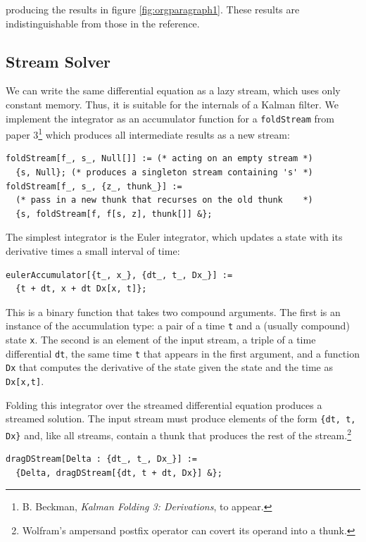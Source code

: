 \documentclass[10pt,oneside,x11names]{article}
\begin{document}
\noindent producing the results in figure \ref{fig:orgparagraph1}.
These results are indistinguishable from those in the reference.

\subsection{Stream Solver}
\label{sec:orgheadline6}

We can write the same differential equation as a lazy stream, which uses only
constant memory. Thus, it is suitable for the internals of a Kalman filter. We
implement the integrator as an accumulator function for a \texttt{foldStream} from
paper 3\footnote{B. Beckman, \emph{Kalman Folding 3: Derivations}, to appear.} which produces all intermediate results as a new stream:

\begin{verbatim}
foldStream[f_, s_, Null[]] := (* acting on an empty stream *)
  {s, Null}; (* produces a singleton stream containing 's' *)
foldStream[f_, s_, {z_, thunk_}] :=
  (* pass in a new thunk that recurses on the old thunk    *)
  {s, foldStream[f, f[s, z], thunk[]] &};
\end{verbatim}

The simplest integrator is the Euler integrator, which updates a state with its
derivative times a small interval of time: 

\begin{verbatim}
eulerAccumulator[{t_, x_}, {dt_, t_, Dx_}] :=
  {t + dt, x + dt Dx[x, t]};
\end{verbatim}

This is a binary function that takes two compound arguments. The first is an
instance of the accumulation type: a pair of a time \texttt{t} and a (usually compound)
state \texttt{x}. The second is an element of the input stream, a triple of a time
differential \texttt{dt}, the same time \texttt{t} that appears in the first argument, and a
function \texttt{Dx} that computes the derivative of the state given the state and the
time as \texttt{Dx[x,t]}. 

Folding this integrator over the streamed differential equation produces a
streamed solution. The input stream must produce elements of the form
\texttt{\{dt, t, Dx\}} and, like all streams, contain a thunk that produces the rest of the
stream.\footnote{Wolfram's ampersand postfix operator can covert its operand into a thunk.}

\begin{verbatim}
dragDStream[Delta : {dt_, t_, Dx_}] :=
  {Delta, dragDStream[{dt, t + dt, Dx}] &};
\end{verbatim}
\end{document}
